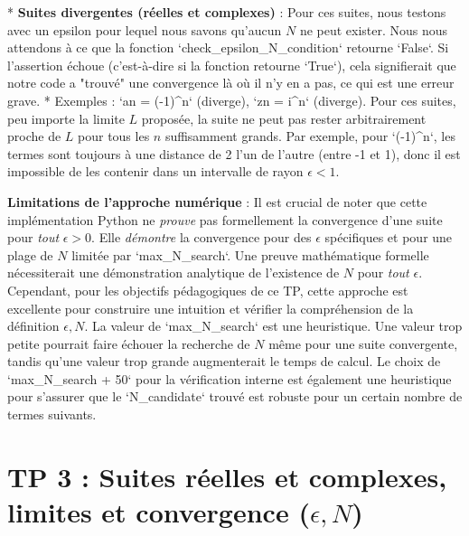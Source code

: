 \documentclass[a4paper,11pt]{report}
\begin{document}
*   \textbf{Suites divergentes (réelles et complexes)} : Pour ces suites, nous testons avec un epsilon pour lequel nous savons qu'aucun $N$ ne peut exister. Nous nous attendons à ce que la fonction `check\_epsilon\_N\_condition` retourne `False`. Si l'assertion échoue (c'est-à-dire si la fonction retourne `True`), cela signifierait que notre code a "trouvé" une convergence là où il n'y en a pas, ce qui est une erreur grave.
    *   Exemples : `an = (-1)^n` (diverge), `zn = i^n` (diverge). Pour ces suites, peu importe la limite $L$ proposée, la suite ne peut pas rester arbitrairement proche de $L$ pour tous les $n$ suffisamment grands. Par exemple, pour `(-1)^n`, les termes sont toujours à une distance de 2 l'un de l'autre (entre -1 et 1), donc il est impossible de les contenir dans un intervalle de rayon $\epsilon < 1$.

\textbf{Limitations de l'approche numérique} :
Il est crucial de noter que cette implémentation Python ne \textit{prouve} pas formellement la convergence d'une suite pour \textit{tout} $\epsilon > 0$. Elle \textit{démontre} la convergence pour des $\epsilon$ spécifiques et pour une plage de $N$ limitée par `max\_N\_search`. Une preuve mathématique formelle nécessiterait une démonstration analytique de l'existence de $N$ pour \textit{tout} $\epsilon$. Cependant, pour les objectifs pédagogiques de ce TP, cette approche est excellente pour construire une intuition et vérifier la compréhension de la définition $\epsilon, N$.
La valeur de `max\_N\_search` est une heuristique. Une valeur trop petite pourrait faire échouer la recherche de $N$ même pour une suite convergente, tandis qu'une valeur trop grande augmenterait le temps de calcul. Le choix de `max\_N\_search + 50` pour la vérification interne est également une heuristique pour s'assurer que le `N\_candidate` trouvé est robuste pour un certain nombre de termes suivants.

\vspace{1cm}

\section*{TP 3 : Suites réelles et complexes, limites et convergence ($\epsilon, N$)}
\end{document}
